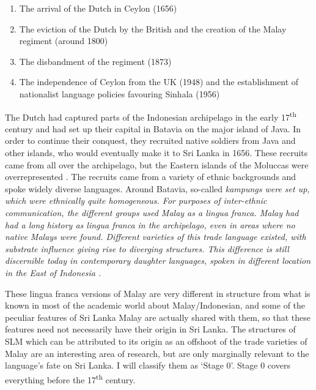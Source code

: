 \begin{enumerate}
 \item The arrival of the Dutch in Ceylon (1656)
 \item The eviction of the Dutch by the British and the creation of the Malay regiment (around 1800)
 \item The disbandment of the regiment (1873)
 \item The independence of Ceylon from the UK (1948) and the establishment of nationalist language policies favouring Sinhala (1956)
\end{enumerate}

The Dutch had captured parts of the Indonesian archipelago in the early 17\textsuperscript{th} century and had set up their capital in Batavia on the major island of Java. In order to continue their conquest, they recruited native soldiers from Java and other islands, who would eventually make it to Sri Lanka in 1656. These recruits came from all over the archipelago, but the Eastern islands of the Moluccas were overrepresented \citep{Paauwtv}. The recruits came from a variety of ethnic backgrounds and spoke widely diverse languages. Around Batavia, so-called \em kampungs \em were set up, which were ethnically quite homogeneous. For purposes of inter-ethnic communication, the different groups used Malay as a lingua franca. Malay had had a long history as lingua franca in the archipelago, even in areas where no native Malays were found. Different varieties of this trade language existed, with substrate influence giving rise to diverging structures. This difference is still discernible today in contemporary daughter languages, spoken in different location in the East of Indonesia \citep{Paauw2008phd}. 

These lingua franca versions of Malay are very different in structure from what is known in most of the academic world about Malay/Indonesian, and some of the peculiar features of Sri Lanka Malay are actually shared with them, so that these features need not necessarily have their origin in Sri Lanka. The structures of SLM which can be attributed to its origin as an offshoot of the trade varieties of Malay are an interesting area of research, but are only marginally relevant to the language's fate on Sri Lanka. I will classify them as `Stage 0'. Stage 0 covers everything before the 17\textsuperscript{th} century.

